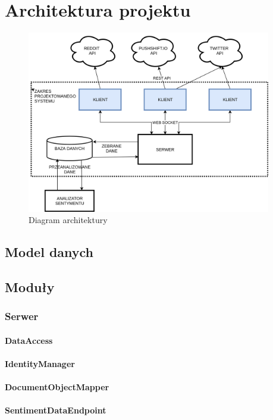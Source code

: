 \section{Architektura projektu}
\begin{figure}[h!]
  \centering
    \includegraphics[width=0.95\textwidth]{img/architecture.png}
  \caption{Diagram architektury}
  \label{fig:arch}
\end{figure}
\subsection{Model danych}
\subsection{Moduły}
\subsubsection{Serwer}
\paragraph*{DataAccess}
\paragraph*{IdentityManager}
\paragraph*{DocumentObjectMapper}
\paragraph*{SentimentDataEndpoint}
